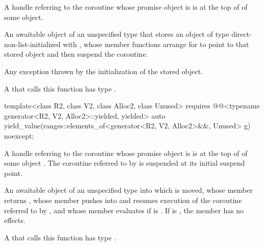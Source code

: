 \begin{itemdescr}
\pnum
\expects
A handle referring to the coroutine
whose promise object is 
is at the top of 
of some  object.

\pnum
\returns
An awaitable object of an unspecified type
that stores an object of type 
direct-non-list-initialized with ,
whose member functions arrange for
 to point to that stored object
and then suspend the coroutine.

\pnum
\throws
Any exception thrown by the initialization of the stored object.

\pnum
\remarks
A  that calls this function
has type .
\end{itemdescr}

%
\begin{itemdecl}
template<class R2, class V2, class Alloc2, class Unused>
  requires @@<typename generator<R2, V2, Alloc2>::yielded, yielded>
  auto yield_value(ranges::elements_of<generator<R2, V2, Alloc2>&&, Unused> g) noexcept;
\end{itemdecl}

\begin{itemdescr}
\pnum
\expects
A handle referring to the coroutine
whose promise object is 
is at the top of 
of some  object .
The coroutine referred to by
is suspended at its initial suspend point.

\pnum
\returns
An awaitable object of an unspecified type
into which  is moved,
whose member  returns ,
whose member 
pushes \mbox{}
into 
and resumes execution of the coroutine referred to
by , and
whose member  evaluates
if  is .
If  is ,
the  member has no effects.

\pnum
\remarks
A  that calls this function
has type .
\end{itemdescr}

